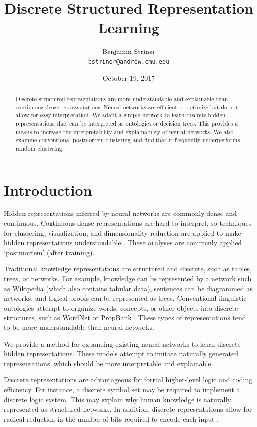 \documentclass[11pt,letterpaper]{article}
\title{Discrete Structured Representation Learning}
\author{Benjamin Striner \\
  {\tt bstriner@andrew.cmu.edu} \\}
\date{October 19, 2017}
\begin{document}
\maketitle
\begin{abstract}
Discrete structured representations are more understandable and explainable than continuous dense representations. Neural networks are efficient to optimize but do not allow for easy interpretation. We adapt a simple network to learn discrete hidden representations that can be interpreted as ontologies or decision trees. This provides a means to increase the interpretability and explainability of neural networks. We also examine conventional postmortem clustering and find that it frequently underperforms random clustering.
\end{abstract}

\section{Introduction}

Hidden representations inferred by neural networks are commonly dense and continuous. Continuous dense representations are hard to interpret, so techniques for clustering, visualization, and dimensionality reduction are applied to make hidden representations understandable \cite{Montavon}. These analyses are commonly applied `postmortem' (after training).

Traditional knowledge representations are structured and discrete, such as tables, trees, or networks. For example, knowledge can be represented by a network such as Wikipedia (which also contains tabular data), sentences can be diagrammed as networks, and logical proofs can be represented as trees. Conventional linguistic ontologies attempt to organize words, concepts, or other objects into discrete structures, such as WordNet \cite{Miller:1995:WLD:219717.219748} or PropBank \cite{Kingsbury02fromtreebank}. These types of representations tend to be more understandable than neural networks.

We provide a method for expanding existing neural networks to learn discrete hidden representations. These models attempt to imitate naturally generated representations, which should be more interpretable and explainable.

Discrete representations are advantageous for formal higher-level logic and coding efficiency. For instance, a discrete symbol set may be required to implement a discrete logic system. This may explain why human knowledge is naturally represented as structured networks. In addition, discrete representations allow for radical reduction in the number of bits required to encode each input \cite{Hu17}.
\end{document}
